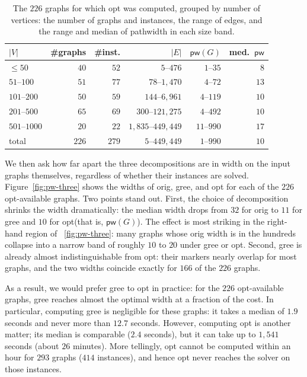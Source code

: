 \documentclass[conference]{IEEEtran}
\newcommand{\OrigDecom}{\textsf{orig}\xspace}
\newcommand{\HeurDecom}{\textsf{gree}\xspace}
\newcommand{\OptDecom}{\textsf{opt}\xspace}
\begin{document}
\begin{table}[t]
  \centering
  \caption{The $226$ graphs for which \OptDecom was computed, grouped by number of
  vertices: the number of graphs and instances, the range of edges, and the range
  and median of pathwidth in each size band.}
  \label{tab:graphs226}
  \setlength{\tabcolsep}{4pt}
  \begin{tabular}{lrrrrr}
    \hline
    $|V|$ & \#graphs & \#inst. & $|E|$ & $\mathsf{pw}(G)$ & med.\ $\mathsf{pw}$ \\
    \hline
    $\le 50$      & $40$ & $52$ & $5$--$476$            & $1$--$35$  & $8$  \\
    $51$--$100$   & $51$ & $77$ & $78$--$1{,}470$       & $4$--$72$  & $13$ \\
    $101$--$200$  & $50$ & $59$ & $144$--$6{,}961$      & $4$--$119$ & $10$ \\
    $201$--$500$  & $65$ & $69$ & $300$--$121{,}275$    & $4$--$492$ & $10$ \\
    $501$--$1000$ & $20$ & $22$ & $1{,}835$--$449{,}449$ & $11$--$990$ & $17$ \\
    \hline
    total         & $226$ & $279$ & $5$--$449{,}449$   & $1$--$990$ & $10$ \\
    \hline
  \end{tabular}
\end{table}

We then ask how far apart the three decompositions are in width on the input
graphs themselves, regardless of whether their instances are solved.
Figure~\ref{fig:pw-three} shows the widths of \OrigDecom, \HeurDecom, and
\OptDecom for each of the $226$ \OptDecom-available graphs.
%
Two points stand out. First, the choice of decomposition
shrinks the width dramatically: the median width drops from $32$ for \OrigDecom to
$11$ for \HeurDecom and $10$ for \OptDecom (that is, $\mathsf{pw}(G)$). 
The effect is most striking in the right-hand region of \figurename~\ref{fig:pw-three}: 
many graphs whose \OrigDecom width is in the hundreds collapse into a narrow band of roughly $10$
to $20$  under \HeurDecom or \OptDecom.
Second, \HeurDecom is already almost indistinguishable from \OptDecom: their markers
nearly overlap for most graphs, and the two widths
coincide exactly for $166$ of the $226$ graphs. 

As a result, we would prefer \HeurDecom to \OptDecom in
practice: for the $226$ \OptDecom-available graphs, \HeurDecom reaches almost the optimal width at a fraction of the cost. 
In particular, computing \HeurDecom is negligible for these graphs: it
takes a median of $1.9$ seconds and never more than $12.7$ seconds. 
However, computing \OptDecom is another matter; its median is comparable ($2.4$ seconds), but it can take up to
$1{,}541$ seconds (about $26$ minutes). More tellingly, \OptDecom cannot be computed within an hour for $293$ graphs ($414$
instances), and hence \OptDecom never reaches the solver on those instances.
\end{document}
